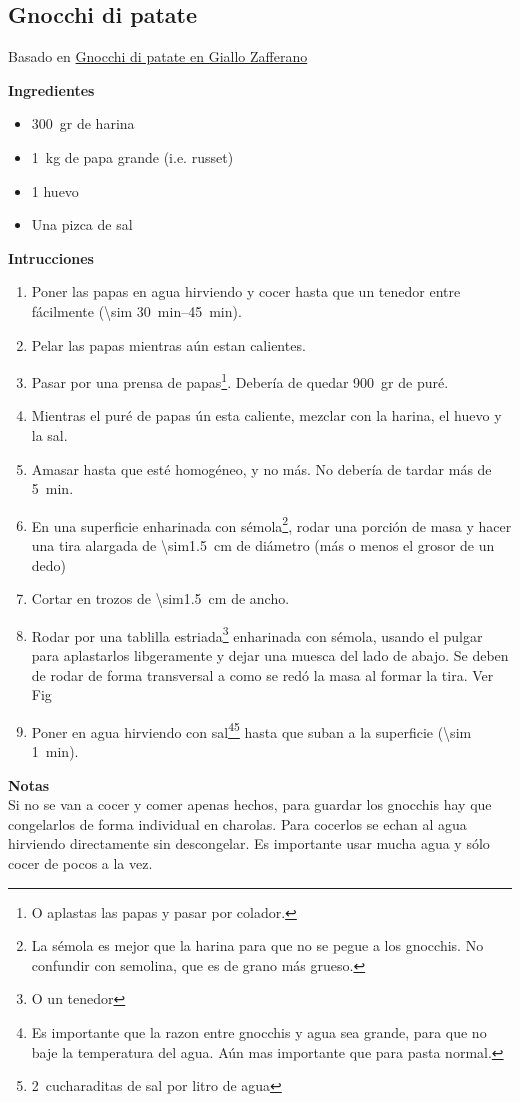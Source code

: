 \subsection{Gnocchi di patate}

Basado en \href{https://ricette.giallozafferano.it/Gnocchi-di-patate.html}{Gnocchi di patate en Giallo Zafferano}

\textbf{Ingredientes}
\begin{itemize}
\item \SI{300}{gr} de harina
\item \SI{1}{kg} de papa grande (i.e. russet)
\item 1 huevo
\item Una pizca de sal
\end{itemize}

\textbf{Intrucciones}
\begin{enumerate}
\item Poner las papas en agua hirviendo y cocer hasta que un tenedor entre fácilmente (\SIrange{\sim 30}{45}{min}).
\item Pelar las papas mientras aún estan calientes.
\item Pasar por una prensa de papas\footnote{O aplastas las papas y pasar por colador.}. Debería de quedar \SI{900}{gr} de puré.
\item Mientras el puré de papas ún esta caliente, mezclar con la harina, el huevo y la sal. 
\item Amasar hasta que esté homogéneo, y no más. No debería de tardar más de \SI{5}{min}.
\item En una superficie enharinada con sémola\footnote{La sémola es mejor que la harina para que no se pegue a los gnocchis. No confundir con semolina, que es de grano más grueso.}, rodar una porción de masa y hacer una tira alargada de \SI{\sim1.5}{cm} de diámetro (más o menos el grosor de un dedo)
\item Cortar en trozos de \SI{\sim1.5}{cm} de ancho.
\item Rodar por una tablilla estriada\footnote{O un tenedor} enharinada con sémola, usando el pulgar para aplastarlos libgeramente y dejar una muesca del lado de abajo. Se deben de rodar de forma transversal a como se redó la masa al formar la tira. Ver Fig 
\item Poner en agua hirviendo con sal\footnote{Es importante que la razon entre gnocchis y agua sea grande, para que no baje la temperatura del agua. Aún mas importante que para pasta normal.}\footnote{\SI{2}{cucharaditas} de sal por litro de agua} hasta que suban a la superficie (\SI{\sim 1}{min}).
\end{enumerate}

\textbf{Notas}\\
Si no se van a cocer y comer apenas hechos, para guardar los gnocchis hay que congelarlos de forma individual en charolas. Para cocerlos se echan al agua hirviendo directamente sin descongelar. Es importante usar mucha agua y sólo cocer de pocos a la vez. 